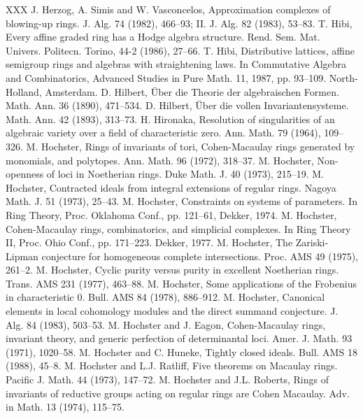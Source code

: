 \begin{thebibliography}{XXX}
 J. Herzog, A. Simis and W. Vasconcelos, Approximation complexes of blowing-up rings. J. Alg. 74 (1982), 466--93; II. J. Alg. 82 (1983), 53--83.
 T. Hibi, Every affine graded ring has a Hodge algebra structure. Rend. Sem. Mat. Univers. Politecn. Torino, 44-2 (1986), 27--66.
 T. Hibi, Distributive lattices, affine semigroup rings and algebras with straightening laws. In Commutative Algebra and Combinatorics, Advanced Studies in Pure Math. 11, 1987, pp. 93--109. North-Holland, Amsterdam.
 D. Hilbert, \"Uber die Theorie der algebraischen Formen. Math. Ann. 36 (1890), 471--534.
 D. Hilbert, \"Uber die vollen Invariantensysteme. Math. Ann. 42 (1893), 313--73.
 H. Hironaka, Resolution of singularities of an algebraic variety over a field of characteristic zero. Ann. Math. 79 (1964), 109--326.
 M. Hochster, Rings of invariants of tori, Cohen-Macaulay rings generated by monomials, and polytopes. Ann. Math. 96 (1972), 318--37.
 M. Hochster, Non-openness of loci in Noetherian rings. Duke Math. J. 40 (1973), 215--19.
 M. Hochster, Contracted ideals from integral extensions of regular rings. Nagoya Math. J. 51 (1973), 25--43.
 M. Hochster, Constraints on systems of parameters. In Ring Theory, Proc. Oklahoma Conf., pp. 121--61, Dekker, 1974.
 M. Hochster, Cohen-Macaulay rings, combinatorics, and simplicial complexes. In Ring Theory II, Proc. Ohio Conf., pp. 171--223. Dekker, 1977.
 M. Hochster, The Zariski-Lipman conjecture for homogeneous complete intersections. Proc. AMS 49 (1975), 261--2.
 M. Hochster, Cyclic purity versus purity in excellent Noetherian rings. Trans. AMS 231 (1977), 463--88.
 M. Hochster, Some applications of the Frobenius in characteristic 0. Bull. AMS 84 (1978), 886--912.
 M. Hochster, Canonical elements in local cohomology modules and the direct summand conjecture. J. Alg. 84 (1983), 503--53.
 M. Hochster and J. Eagon, Cohen-Macaulay rings, invariant theory, and generic perfection of determinantal loci. Amer. J. Math. 93 (1971), 1020--58.
 M. Hochster and C. Huneke, Tightly closed ideals. Bull. AMS 18 (1988), 45--8.
 M. Hochster and L.J. Ratliff, Five theorems on Macaulay rings. Pacific J. Math. 44 (1973), 147--72.
 M. Hochster and J.L. Roberts, Rings of invariants of reductive groups acting on regular rings are Cohen Macaulay. Adv. in Math. 13 (1974), 115--75.

\end{thebibliography}
